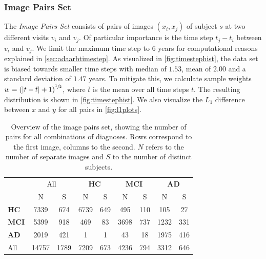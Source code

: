 \subsubsection*{Image Pairs Set} \label{sec:datpairs}
The \textit{Image Pairs Set} consists of pairs of images $(x_i, x_j)$ of subject $s$ at two different visits $v_i$ and $v_j$. Of particular importance is the time step $t_j - t_i$ between $v_i$ and $v_j$. We limit the maximum time step to 6 years for computational reasons explained in \autoref{sec:adaarbtimestep}. As visualized in \autoref{fig:timestephist}, the data set is biased towards smaller time steps with median of $1.53$, mean of $2.00$ and a standard deviation of $1.47$ years. To mitigate this, we calculate sample weights $w = {(| t - \bar t | + 1)}^{\sfrac{1}{2}}$, where $\bar t$ is the mean over all time steps $t$. The resulting distribution is shown in \autoref{fig:timestephist}. We also visualize the $L_1$ difference between $x$ and $y$ for all pairs in \autoref{fig:l1plots}.

\begin{table}[p]
	\begin{center}
		\begin{tabular}{l c c | c c c c c c}
			\toprule
			& 
			\multicolumn{2}{c}{All} &
			\multicolumn{2}{c}{\bfseries HC} & 
			\multicolumn{2}{c}{\bfseries MCI} & 
			\multicolumn{2}{c}{\bfseries AD} \\
			\cmidrule(lr){2-3}
			\cmidrule(lr){4-5}
			\cmidrule(lr){6-7}
			\cmidrule(lr){8-9}
			& N & \multicolumn{1}{c}{S} & N & S & N & S & N & S \\ 
			\cmidrule(lr){1-9}
			\bfseries HC  &  7339 &  674 & 6739 & 649 &  495 & 110 &  105 &  27 \\
			\bfseries MCI &  5399 &  918 &  469 &  83 & 3698 & 737 & 1232 & 331 \\
			\bfseries AD  &  2019 &  421 &    1 &   1 &   43 &  18 & 1975 & 416 \\
			\cmidrule(lr){1-9}
			All           & 14757 & 1789 & 7209 & 673 & 4236 & 794 & 3312 & 646 \\
			\bottomrule
		\end{tabular}
		\caption{Overview of the image pairs set, showing the number of pairs for all combinations of diagnoses. Rows correspond to the first image, columns to the second. $N$ refers to the number of separate images and $S$ to the number of distinct subjects.}
		\label{tab:pairsset}
	\end{center}
\end{table}

